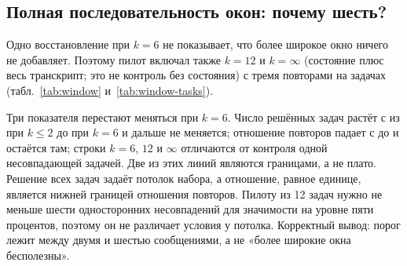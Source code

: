 

\subsection{Полная последовательность окон: почему шесть?}
Одно восстановление при $k=6$ не показывает, что более широкое окно
ничего не добавляет. Поэтому пилот включал также $k=12$ и $k=\infty$
(состояние плюс весь транскрипт; это не контроль без состояния) с тремя
повторами на \WindowTaskCount{} задачах (табл.~\ref{tab:window}
и~\ref{tab:window-tasks}).

\begin{table}[htbp]
\centering\small
\caption{Пилот окон в стандартных двух панелях (окончательные медианы по
трём повторам). Доли решённых по выполнениям, эффективность, объединённые
отношения стоимости и входные счётчики не сохранились (--). Cache hit ---
зарегистрированное значение пилота, а не реконструкция по счётчикам.}
\label{tab:window}
\resizebox{\linewidth}{!}{}

\medskip
\resizebox{\linewidth}{!}{}
\end{table}

\begin{table}[htbp]
\centering\small
\caption{Исходы пилота окон по журналу исследования (исходные сессии
недоступны). Задача считается решённой, если прошёл хотя бы один из трёх
повторов. Несовпадающие пары и точный $p$ Мак-Немара --- относительно
полной истории. Выход на ход --- зарегистрированная медиана.}
\label{tab:window-tasks}
\resizebox{\linewidth}{!}{}
\end{table}

Три показателя перестают меняться при $k=6$. Число решённых задач растёт
с \WindowStateTasksSolved{} из \WindowTaskCount{} при $k\leq2$ до
\WindowSixTasksSolved{} при $k=6$ и дальше не меняется; отношение
повторов падает с \WindowStateRepetition{} до \WindowSixRepetition{}
и остаётся там; строки $k=6$, $12$ и $\infty$ отличаются от контроля
одной несовпадающей задачей. Две из этих линий являются границами, а не плато.
Решение всех \WindowTaskCount{} задач задаёт потолок набора,
а отношение, равное единице, является нижней границей отношения повторов. Пилоту из 12 задач нужно не
меньше шести односторонних несовпадений для значимости на уровне пяти процентов, поэтому он не
различает условия у потолка. Корректный вывод: порог лежит между двумя
и шестью сообщениями, а не «более широкие окна бесполезны».

